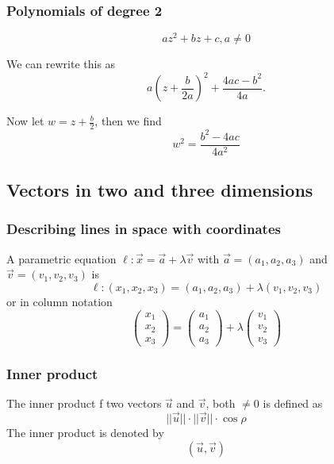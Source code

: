 \documentclass{article}
\begin{document}
		\subsubsection{Polynomials of degree 2}
			\begin{equation*}
				az^2+bz+c, a \neq 0
			\end{equation*}
			
			We can rewrite this as 
			\begin{equation*}
				a(z+\frac{b}{2a})^2 + \frac{4ac-b^2}{4a}.
			\end{equation*}
			
			Now let $w=z+\frac{b}{2}$, then we find
			\begin{equation*}
				w^2 = \frac{b^2-4ac}{4a^2}
			\end{equation*}
	\subsection{Vectors in two and three dimensions}
		\subsubsection{Describing lines in space with coordinates}
			A parametric equation $\ell: \vec{x} = \vec{a} + \lambda\vec{v}$ with $\vec{a} = (a_1, a_2, a_3)$ and $\vec{v} = (v_1, v_2, v_3)$ is
			\begin{equation*}
				\ell: (x_1, x_2, x_3) = (a_1, a_2, a_3) + \lambda(v_1, v_2, v_3)
			\end{equation*}
			or in column notation
			\begin{equation*}
				\begin{pmatrix}
					x_1 \\
					x_2 \\
					x_3
				\end{pmatrix} = 
				\begin{pmatrix}
					a_1 \\
					a_2 \\
					a _3 
				\end{pmatrix}
				+ \lambda 
				\begin{pmatrix}
					v_1 \\
					v_2 \\
					v_3
				\end{pmatrix}
			\end{equation*}
		\subsubsection{Inner product}
		The inner product f two vectors $\vec{u}$ and $\vec{v}$, both $\neq 0$ is defined as
		\begin{equation*}
			||\vec{u}||\cdot||\vec{v}|| \cdot \cos{\rho}
		\end{equation*}
		The inner product is denoted by 
		\begin{equation*}
			(\vec{u}, \vec{v})
		\end{equation*}
		
\end{document}
